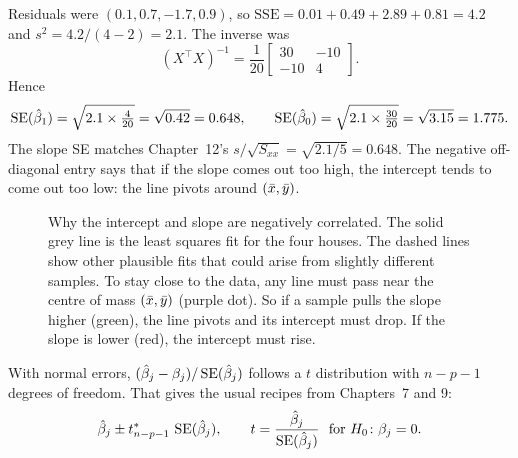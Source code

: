 \begin{example}
Residuals were $(0.1, 0.7, -1.7, 0.9)$, so $\text{SSE} = 0.01 + 0.49 + 2.89 + 0.81 = 4.2$
and $s^2 = 4.2/(4-2) = 2.1$. The inverse was
\[
  (X^\top X)^{-1} = \frac{1}{20}\begin{bmatrix}30&-10\\-10&4\end{bmatrix}.
\]
Hence
\[
  \operatorname{SE}(\hat\beta_1) = \sqrt{2.1\times\tfrac{4}{20}} = \sqrt{0.42} = 0.648, \qquad
  \operatorname{SE}(\hat\beta_0) = \sqrt{2.1\times\tfrac{30}{20}} = \sqrt{3.15} = 1.775 .
\]
The slope SE matches Chapter~12's $s/\sqrt{S_{xx}} = \sqrt{2.1/5} = 0.648$. The
negative off-diagonal entry says that if the slope comes out too high, the intercept
tends to come out too low: the line pivots around $(\bar{x},\bar{y})$.

\begin{figure}[H]
\centering
{}
\caption{Why the intercept and slope are negatively correlated. The solid grey line is the least squares fit for the four houses. The dashed lines show other plausible fits that could arise from slightly different samples. To stay close to the data, any line must pass near the centre of mass $(\bar{x}, \bar{y})$ (purple dot). So if a sample pulls the slope higher (green), the line pivots and its intercept must drop. If the slope is lower (red), the intercept must rise.}
\label{fig:mlr-pivot}
\end{figure}

\end{example}

With normal errors, $(\hat\beta_j - \beta_j)/\operatorname{SE}(\hat\beta_j)$ follows a $t$
distribution with $n - p - 1$ degrees of freedom. That gives the usual recipes from
Chapters~7 and 9:
\[
  \hat\beta_j \pm t^*_{n-p-1}\,\operatorname{SE}(\hat\beta_j), \qquad
  t = \frac{\hat\beta_j}{\operatorname{SE}(\hat\beta_j)}\ \text{ for } H_0\colon \beta_j = 0 .
\]

